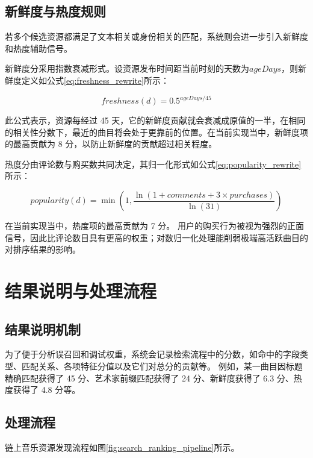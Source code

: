 \subsection{新鲜度与热度规则}

若多个候选资源都满足了文本相关或身份相关的匹配，系统则会进一步引入新鲜度和热度辅助信号。

新鲜度分采用指数衰减形式。设资源发布时间距当前时刻的天数为$ageDays$，则新鲜度定义如公式\eqref{eq:freshness_rewrite}所示：

\begin{equation}
    freshness(d)=0.5^{ageDays/45}
    \label{eq:freshness_rewrite}
\end{equation}

此公式表示，资源每经过 45 天，它的新鲜度贡献就会衰减成原值的一半，在相同的相关性分数下，最近的曲目将会处于更靠前的位置。在当前实现当中，新鲜度项的最高贡献为 8 分，以防止新鲜度的贡献超过相关程度。

热度分由评论数与购买数共同决定，其归一化形式如公式\eqref{eq:popularity_rewrite}所示：

\begin{equation}
    popularity(d)=\min\left(1,\frac{\ln(1+comments+3\times purchases)}{\ln(31)}\right)
    \label{eq:popularity_rewrite}
\end{equation}

在当前实现当中，热度项的最高贡献为 7 分。
用户的购买行为被视为强烈的正面信号，因此比评论数目具有更高的权重；对数归一化处理能削弱极端高活跃曲目的对排序结果的影响。


\section{结果说明与处理流程}

\subsection{结果说明机制}

为了便于分析误召回和调试权重，系统会记录检索流程中的分数，如命中的字段类型、匹配关系、各项特征分值以及它们对总分的贡献等。 例如，某一曲目因标题精确匹配获得了 45 分、艺术家前缀匹配获得了 24 分、新鲜度获得了 6.3 分、热度获得了 4.8 分等。

\subsection{处理流程}

链上音乐资源发现流程如图\ref{fig:search_ranking_pipeline}所示。

